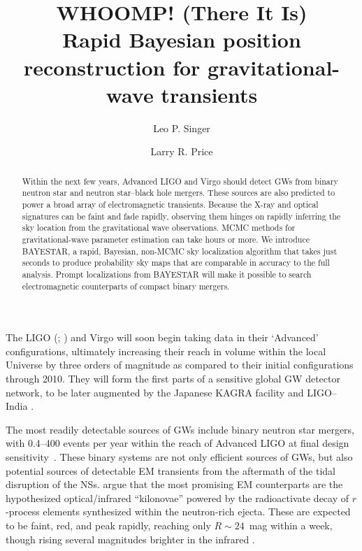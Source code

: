 \documentclass[amsmath,amssymb,aps,prx,reprint,nopreprintnumbers,nofootinbib]{revtex4-1}
\begin{document}
\title[Rapid-response Bayesian sky localization]{WHOOMP! (There It Is) \\
Rapid Bayesian position reconstruction for gravitational\nobreakdashes-wave transients}
\author{Leo P. Singer}
\author{Larry R. Price}

\begin{abstract}
Within the next few years, Advanced LIGO and Virgo should detect \acp{GW} from binary neutron star and neutron star\nobreakdashes--black hole mergers. These sources are also predicted to power a broad array of electromagnetic transients. Because the X\nobreakdashes-ray and optical signatures can be faint and fade rapidly, observing them hinges on rapidly inferring the sky location from the gravitational wave observations. \ac{MCMC} methods for gravitational\nobreakdashes-wave parameter estimation can take hours or more. We introduce BAYESTAR, a rapid, Bayesian, non-\ac{MCMC} sky localization algorithm that takes just seconds to produce probability sky maps that are comparable in accuracy to the full analysis. Prompt localizations from BAYESTAR will make it possible to search electromagnetic counterparts of compact binary mergers.
\end{abstract}

\maketitle

The \acl{LIGO} (; \cite{AdvancedLIGOHarry,AdvancedLIGO}) and Virgo \cite{AdvancedVirgo} will soon begin taking data \cite{LIGOObservingScenarios} in their `Advanced' configurations, ultimately increasing their reach in volume within the local Universe by three orders of magnitude as compared to their initial configurations through 2010. They will form the first parts of a sensitive global \ac{GW} detector network, to be later augmented by the Japanese KAGRA facility \cite{LCGT,KAGRAInterferometerDesign} and \ac{LIGO}\nobreakdashes--India \cite{LIGOIndia}.

The most readily detectable sources of \acp{GW} include binary neutron star mergers, with 0.4\nobreakdashes--400 events per year within the reach of Advanced LIGO at final design sensitivity~\cite{rates}. These binary systems are not only efficient sources of \acp{GW}, but also potential sources of detectable \ac{EM} transients from the aftermath of the tidal disruption of the \acp{NS}. \citet{MostPromisingEMCounterpart} argue that the most promising \ac{EM} counterparts are the hypothesized optical/infrared ``kilonovae'' powered by the radioactivate decay of $r$\nobreakdashes-process elements synthesized within the neutron\nobreakdashes-rich ejecta. These are expected to be faint, red, and peak rapidly, reaching only $R \sim 24$~mag within a week, though rising several magnitudes brighter in the infrared \citep{KilonovaHighOpacities}.
\end{document}
